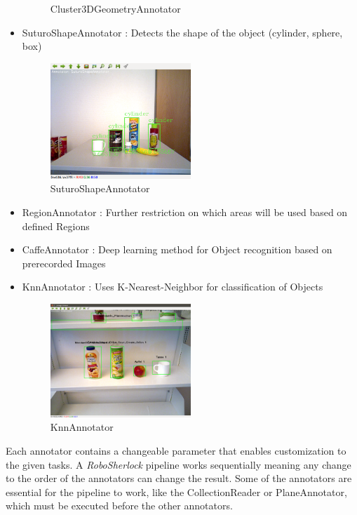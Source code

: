 \documentclass[main.tex]{subfiles}
\begin{document}
\begin{itemize}
\begin{figure}[H]
   			 \caption{Cluster3DGeometryAnnotator}
  		\end{figure}
	\item SuturoShapeAnnotator : Detects the shape of the object (cylinder, sphere, box)
		\begin{figure}[H]
   			 \centering
    			 \includegraphics[width=0.5\textwidth]{pictures/2d/SuturoShapeAnnotator.png}
   			 \caption{SuturoShapeAnnotator}
  		\end{figure}
	\item RegionAnnotator : Further restriction on which areas will be used based on defined Regions 
	\item CaffeAnnotator : Deep learning method for Object recognition based on prerecorded Images 
	\item KnnAnnotator : Uses K-Nearest-Neighbor for classification of Objects 
		\begin{figure}[H]
   			 \centering
    			 \includegraphics[width=0.5\textwidth]{pictures/2d/KnnAnnotator.png}
   			 \caption{KnnAnnotator}
  		\end{figure}
\end{itemize}

Each annotator contains a changeable parameter that enables customization to the given tasks.
A \textit{RoboSherlock} pipeline works sequentially meaning any change to the order of the annotators can change the result. Some of the annotators are essential for the pipeline to work, like the CollectionReader or PlaneAnnotator, which must be executed before the other annotators. 
\end{document}
